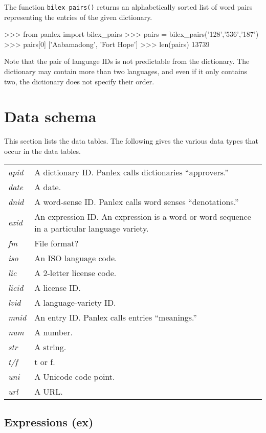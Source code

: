 The function \verb|bilex_pairs()| returns an alphabetically sorted
list of word pairs representing the entries of the given dictionary.
\begin{myverb}
>>> from panlex import bilex_pairs
>>> pairs = bilex_pairs('128','536','187')
>>> pairs[0]
['Aabamadong', 'Fort Hope']
>>> len(pairs)
13739
\end{myverb}
Note that the pair of language IDs is not predictable from the
dictionary.  The dictionary may contain more than two languages, and
even if it only contains two, the dictionary does not specify their
order.


\section{Data schema}

This section lists the data tables.  The following gives the various
data types that occur in the data tables.
\begin{trivlist}\item
\begin{tabular}{|lp{3.75in}|}
\hline
{\it apid} & A dictionary ID.  Panlex calls dictionaries ``approvers.''\\
{\it date} & A date.\\
{\it dnid} & A word-sense ID.  Panlex calls word senses ``denotations.''\\
{\it exid} & An expression ID.  An expression is a word or word sequence in
  a particular language variety.\\
{\it fm} & File format?\\
{\it iso} & An ISO language code.\\
{\it lic} & A 2-letter license code.\\
{\it licid} & A license ID.\\
{\it lvid} & A language-variety ID.\\
{\it mnid} & An entry ID.  Panlex calls entries ``meanings.''\\
{\it num} & A number.\\
{\it str} & A string.\\
{\it t/f} & t or f.\\
{\it uni} & A Unicode code point.\\
{\it url} & A URL.\\
\hline
\end{tabular}
\end{trivlist}

\subsection{Expressions (ex)}

